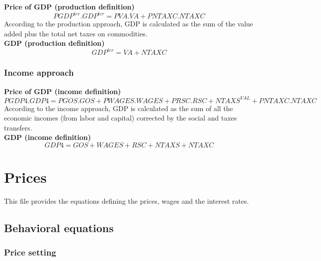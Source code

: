 \documentclass[12pt]{article}
\numberwithin{equation}{section}
\begin{document}
\noindent \textbf{Price of GDP (production definition)} 
\begin{dmath}
PGDP^{ter} . GDP^{ter} = PVA . VA + PNTAXC . NTAXC
\label{SU.mdlPGDPter}
\end{dmath}
According to the production approach, GDP is calculated as the sum of the value added plus the total net taxes on commodities. \\

\noindent \textbf{ GDP (production definition)} 
\begin{dmath}
GDP^{ter} = VA + NTAXC
\label{SU.mdlGDPter}
\end{dmath}



\subsubsection{Income approach}


\noindent \textbf{Price of GDP (income definition)} 
\begin{dmath}
PGDP4 . GDP4 = PGOS . GOS + PWAGES . WAGES + PRSC . RSC + NTAXS^{VAL} + PNTAXC . NTAXC
\label{SU.mdlPGDP4}
\end{dmath}
According to the income approach, GDP is calculated as the sum of all the economic incomes (from labor and capital) corrected by the social and taxes transfers. \\

\noindent \textbf{  GDP (income definition)} 
\begin{dmath}
GDP4 = GOS + WAGES + RSC + NTAXS + NTAXC
\label{SU.mdlGDP4}
\end{dmath}



\section{Prices}



This file provides the equations defining the prices, wages and the interest rates. \\



\subsection{Behavioral equations}





\subsubsection{Price setting}
\end{document}
